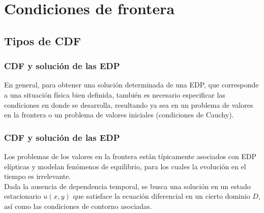 \documentclass[12pt]{beamer}
\begin{document}
\section{Condiciones de frontera}
\subsection{Tipos de CDF}
\begin{frame}
\frametitle{CDF y solución de las EDP}
En general, para obtener una solución determinada de una EDP, que corresponde a una situación física bien definida, también es necesario especificar las condiciones en donde se desarrolla, resultando ya sea en un problema de valores en la frontera o un problema de valores iniciales (condiciones de Cauchy).
\end{frame}
\begin{frame}
\frametitle{CDF y solución de las EDP}
Los problemas de los valores en la frontera están típicamente asociados con EDP elípticas y modelan fenómenos de equilibrio, para los cuales la evolución en el tiempo es irrelevante.
\\
\bigskip
Dada la ausencia de dependencia temporal, se busca una solución en un estado estacionario $u(x, y)$ que satisface la ecuación diferencial en un cierto dominio $D$, así como las condiciones de contorno asociadas. 
\end{frame}
\end{document}
